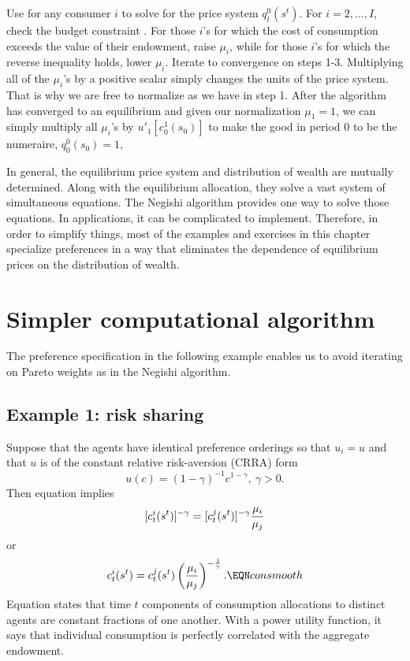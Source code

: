 \medskip
{}  Use  for any consumer $i$ to solve for the
price system $q_t^0(s^t)$.
\medskip
{}  For $i =2, \ldots, I$, check the budget constraint
.  For those $i$'s for which the cost of consumption
exceeds the value of their endowment, raise $\mu_i$, while for
those $i$'s for which the reverse inequality holds, lower $\mu_i$.
\medskip {} Iterate to convergence on steps 1-3.
\medskip
\noindent Multiplying all of the $\mu_i$'s by a positive scalar
simply  changes the units of the price system. That is why we
are free to normalize as we have in step 1. After the
algorithm has converged to an equilibrium and given our
normalization $\mu_1=1$, we can simply multiply all
$\mu_i$'s by  $u'_1[c_0^1(s_0)]$ to make the good in
period 0 to be the numeraire, $q^0_0(s_0)= 1$,

In general, the equilibrium price system and distribution of wealth are mutually determined. Along with the equilibrium allocation, they solve
a vast system of simultaneous equations.  The Negishi algorithm provides one way to solve those equations.
In applications, it can be complicated to implement.  Therefore, in order to simplify things,
  most of the examples and exercises in this chapter specialize  preferences
in a way that eliminates the dependence of equilibrium prices on the distribution of wealth.







\section{Simpler computational algorithm}
The preference specification in the following example enables us to avoid iterating on Pareto weights as in
the Negishi algorithm.
\subsection{Example 1: risk sharing}\label{sec:ex1_risksharing}%
\noindent Suppose that the agents have identical preference orderings so that $u_i = u$ and that
$u$ is of the constant
relative risk-aversion (CRRA) form
$$ u(c) = (1-\gamma)^{-1} c^{1-\gamma} , \ \gamma > 0.$$
Then equation  implies
$$ [c_t^i(s^t)]^{-\gamma}
   = [c_t^j(s^t)]^{-\gamma} {\mu_i \over \mu_j} $$
or
$$ c_t^i(s^t) = c_t^j(s^t) \left({\mu_i \over \mu_j}\right)^{-{1 \over  \gamma}}.
    \EQN consmooth $$
Equation  states that time $t$ components
of consumption allocations  to
distinct agents are
constant fractions of one another. With a power utility function,
 it says that  individual
consumption is perfectly correlated with the aggregate endowment.   

